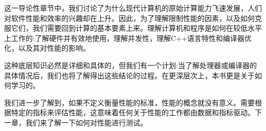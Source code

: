 这一导论性章节中，我们讨论了为什么现代计算机的原始计算能力飞速发展，人们对软件性能和效率的兴趣却在上升。因此，为了理解限制性能的因素，以及如何克服它们，我们需要回到计算的基本要素上来。理解计算机和程序是如何在较低水平上工作的:了解硬件并有效地使用，理解并发性，理解C++语言特性和编译器优化，以及其对性能的影响。

这种底层知识必然是详细和具体的，但我们有一个计划:当了解处理器或编译器的具体情况后，我们也将了解得出这些结论的过程。在更深层次上，本书更是关于如何学习的。

我们进一步了解到，如果不定义衡量性能的标准，性能的概念就没有意义。需要根据特定的指标来评估性能，这意味着任何关于性能的工作都由数据和指标驱动。下一章，我们来了解一下如何对性能进行测试。